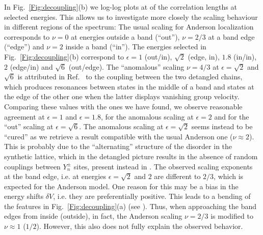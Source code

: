 \documentclass[prl,aps,twocolumn,showpacs,superscriptaddress,longbibliography]{revtex4-1}
\begin{document}
In Fig.~\ref{Fig:decoupling}(b) we log-log plots at of the correlation lengths at selected energies. This allows us to investigate more closely the scaling behaviour in different regions of the spectrum: The usual scaling for Anderson localization corresponds to $\nu = 0$ at energies outside a band (``out''), $\nu = 2/3$ at a band edge (``edge'') and $\nu = 2$ inside a band (``in''). The energies selected in Fig.~\ref{Fig:decoupling}(b) correspond to $\epsilon =1$ (out/in), $\sqrt{2}$ (edge, in), $1.8$ (in/in), $2$ (edge/in) and $\sqrt{6}$ (out/edge). The ``anomalous'' scaling $\nu = 4/3$ at $\epsilon = \sqrt{2}$ and $\sqrt{6}$ is attributed in Ref.~\cite{Leykam2017} to the coupling between the two detangled chains, which produces resonances between states in the middle of a band and states at the edge of the other one when the latter displays vanishing group velocity. Comparing these values with the ones we have found, we observe reasonable agreement at $\epsilon = 1$ and $\epsilon = 1.8$, for the anomalous scaling at $\epsilon = 2$ and for the ``out'' scaling at $\epsilon = \sqrt{6}$. The anomalous scaling at $\epsilon = \sqrt{2}$ seems instead to be ``cured'' as we retrieve a result compatible with the usual Anderson one ($\nu  \approx 2$). This is probably due to the ``alternating'' structure of the disorder in the synthetic lattice, which in the detangled picture results in the absence of random couplings between $Y_n^{\pm}$ sites, present instead in \cite{Leykam2017}. The observed scaling exponents at the band edge, i.e. at energies $\epsilon = \sqrt{2}$ and $2$ are different to $2/3$, which is expected for the Anderson model. One reason for this may be a bias in the energy shifts $\delta V$, i.e. they are preferentially positive. This leads to a bending of the features in Fig.~\ref{Fig:decoupling}(a) (see \cite{SM}). Thus, when approaching the band edges from inside (outside), in fact, the Anderson scaling $\nu = 2/3$ is modified to $\nu \approx 1$ ($1/2$). However, this also does not fully explain the observed behavior.
\end{document}
